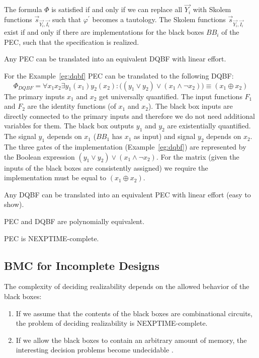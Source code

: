 \documentclass[runningheads]{llncs}
\begin{document}
The formula $\Phi$ is satisfied if and only if we can replace
all $\overrightarrow{Y_i}$ with Skolem functions $\overrightarrow{s}_{\overrightarrow{Y_i},\overrightarrow{I_i}}$ such that $\varphi^{\prime}$ becomes a tautology.
The Skolem functions $\overrightarrow{s}_{\overrightarrow{Y_i},\overrightarrow{I_i}}$ exist if and only if there are implementations for the black boxes $BB_i$ of the PEC, such that the specification is realized.

\begin{lemma}
  Any PEC can be translated into an equivalent DQBF with linear effort.
\end{lemma}


\begin{example}
  For the Example~\ref{eg:dqbf} PEC can be translated to the following DQBF:
\begin{equation} \nonumber
  \Phi_{DQBF} = \forall x_1 x_2 \exists y_1 (x_1) y_2 (x_2) :
  \big( (y_1 \lor y_2) \lor (x_1 \land \neg x_2) \big) \equiv (x_1 \oplus x_2)
\end{equation}
The primary inputs $x_1$ and $x_2$ get universally quantified.
The input functions $F_1$ and $F_2$ are the identity functions (of $x_1$ and $x_2$).
The black box inputs are directly connected to the primary inputs and therefore we do not need additional variables for them.
The black box outputs $y_1$ and $y_2$ are existentially quantified.
The signal $y_1$ depends on $x_1$ ($BB_1$ has $x_1$ as input) and signal $y_2$ depends on $x_2$.
The three gates of the implementation (Example~\ref{eg:dqbf}) are represented by the Boolean expression $(y_1 \lor y_2) \lor (x_1 \land \neg x_2)$.
For the matrix (given the inputs of the black boxes are consistently assigned) we require the implementation must be equal to $(x_1 \oplus x_2)$.
\end{example}

\begin{lemma}
  Any DQBF can be translated into an equivalent PEC with linear effort (easy to show).
\end{lemma}

\begin{theorem}
  PEC and DQBF are polynomially equivalent.
\end{theorem}

\begin{corollary}
  PEC is NEXPTIME-complete.
\end{corollary}

\subsection{BMC for Incomplete Designs \cite{drechsler2018formal}}
The complexity of deciding realizability depends on the allowed behavior of the black boxes:
\begin{enumerate}
  \item If we assume that the contents of the black boxes are combinational circuits, the problem of deciding realizability is NEXPTIME-complete.
  \item If we allow the black boxes to contain an arbitrary amount of memory, the interesting decision problems become undecidable \cite{pnuelir90}.
\end{enumerate}
\end{document}
